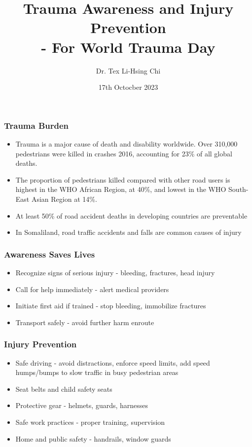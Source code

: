 \documentclass{beamer}
\title{Trauma Awareness and Injury Prevention \\
- For World Trauma Day}
\author{Dr. Tex Li-Hsing Chi}
\date{17th Octocber 2023}
\begin{document}
\begin{frame}
\titlepage
\end{frame}

\begin{frame}
\frametitle{Trauma Burden}
\begin{itemize}
\item Trauma is a major cause of death and disability worldwide. Over 310,000 pedestrians were killed in crashes 2016, accounting for 23\% of all global deaths.
\item The proportion of pedestrians killed compared with other road users is highest in the WHO African Region, at 40\%, and lowest in the WHO South-East Asian Region at 14\%.
\item At least 50\% of road accident deaths in developing countries are preventable
\item In Somaliland, road traffic accidents and falls are common causes of injury  
\end{itemize}
\end{frame}

\begin{frame}
\frametitle{Awareness Saves Lives}
\begin{itemize}
\item Recognize signs of serious injury - bleeding, fractures, head injury
\item Call for help immediately - alert medical providers
\item Initiate first aid if trained - stop bleeding, immobilize fractures
\item Transport safely - avoid further harm enroute 
\end{itemize}  
\end{frame}

\begin{frame}
\frametitle{Injury Prevention}
\begin{itemize}
\item Safe driving - avoid distractions, enforce speed limits, add speed humps/bumps to slow traffic in busy pedestrian areas
\item Seat belts and child safety seats  
\item Protective gear - helmets, guards, harnesses 
\item Safe work practices - proper training, supervision
\item Home and public safety - handrails, window guards 
\end{itemize}
\end{frame}
\end{document}
